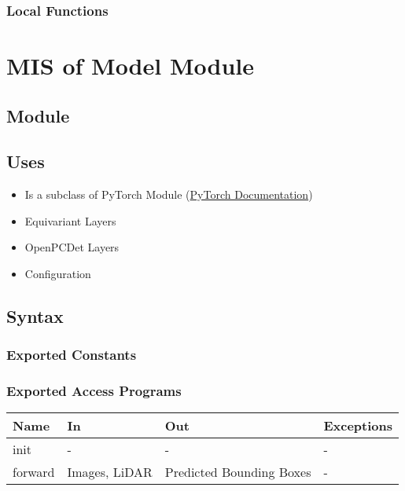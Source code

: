 \documentclass[12pt, titlepage]{article}
\begin{document}
\subsubsection{Local Functions}


\newpage

\section{MIS of Model Module} \label{Module} 

\subsection{Module}

\subsection{Uses}
\begin{itemize}
  \item Is a subclass of PyTorch Module (\href{https://pytorch.org/docs/stable/generated/torch.nn.Module.html}{PyTorch Documentation})
  \item Equivariant Layers
  \item OpenPCDet Layers
  \item Configuration
\end{itemize}

\subsection{Syntax}

\subsubsection{Exported Constants}

\subsubsection{Exported Access Programs}

\begin{center}
  \begin{tabular}{p{2cm}|p{6cm}|p{2cm}|p{2cm}}
  \hline
  \textbf{Name} & \textbf{In} & \textbf{Out} & \textbf{Exceptions} \\
  \hline
  init & - & - & - \\
  \hline
  forward & Images, LiDAR & Predicted Bounding Boxes & - \\
  \hline
  \end{tabular}
\end{center}
\end{document}
